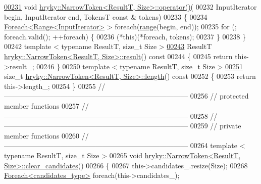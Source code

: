 \begin{DoxyCode}
\hypertarget{narrow__token_8h_source_l00231}{}\hyperlink{classhryky_1_1_narrow_token_a6fe8945316c749abbed245cb7d3b8914}{00231} \textcolor{keywordtype}{void} \hyperlink{classhryky_1_1_narrow_token}{hryky::NarrowToken<ResultT, Size>::operator()}(
00232     InputIterator begin, InputIterator end, TokensT \textcolor{keyword}{const} & tokens)
00233 \{
00234     \hyperlink{classhryky_1_1_foreach}{Foreach<Range<InputIterator>} > \textcolor{keywordflow}{foreach}(\hyperlink{namespacehryky_a6093192359bc9630d58d6158bd0178f4}{range}(begin, end));
00235     \textcolor{keywordflow}{for} (; \textcolor{keywordflow}{foreach}.valid(); ++\textcolor{keywordflow}{foreach}) \{
00236         (*this)(*\textcolor{keywordflow}{foreach}, tokens);
00237     \}
00238 \}
00242 \textcolor{keyword}{template} < \textcolor{keyword}{typename} ResultT, \textcolor{keywordtype}{size\_t} Size >
\hypertarget{narrow__token_8h_source_l00243}{}\hyperlink{classhryky_1_1_narrow_token_af36664ab981d8d2616f8c0c99d145506}{00243} ResultT \hyperlink{classhryky_1_1_narrow_token}{hryky::NarrowToken<ResultT, Size>::result}()\textcolor{keyword}{ const}
00244 \textcolor{keyword}{}\{
00245     \textcolor{keywordflow}{return} this->result\_;
00246 \}
00250 \textcolor{keyword}{template} < \textcolor{keyword}{typename} ResultT, \textcolor{keywordtype}{size\_t} Size >
\hypertarget{narrow__token_8h_source_l00251}{}\hyperlink{classhryky_1_1_narrow_token_a1d27594be3e660ad6a085bf7e7f4d980}{00251} \textcolor{keywordtype}{size\_t} \hyperlink{classhryky_1_1_narrow_token}{hryky::NarrowToken<ResultT, Size>::length}()\textcolor{keyword}{ const}
00252 \textcolor{keyword}{}\{
00253     \textcolor{keywordflow}{return} this->length\_;
00254 \}
00255 \textcolor{comment}{//
      ------------------------------------------------------------------------------}
00256 \textcolor{comment}{// protected member functions}
00257 \textcolor{comment}{//
      ------------------------------------------------------------------------------}
00258 \textcolor{comment}{//
      ------------------------------------------------------------------------------}
00259 \textcolor{comment}{// private member functions}
00260 \textcolor{comment}{//
      ------------------------------------------------------------------------------}
00264 \textcolor{comment}{}\textcolor{keyword}{template} < \textcolor{keyword}{typename} ResultT, \textcolor{keywordtype}{size\_t} Size >
00265 \textcolor{keywordtype}{void} \hyperlink{classhryky_1_1_narrow_token}{hryky::NarrowToken<ResultT, Size>::clear_candidates}()
00266 \{
00267     this->candidates\_.resize(Size);
00268     \hyperlink{classhryky_1_1_foreach}{Foreach<candidates_type>} \textcolor{keywordflow}{foreach}(this->candidates\_);

\end{DoxyCode}

